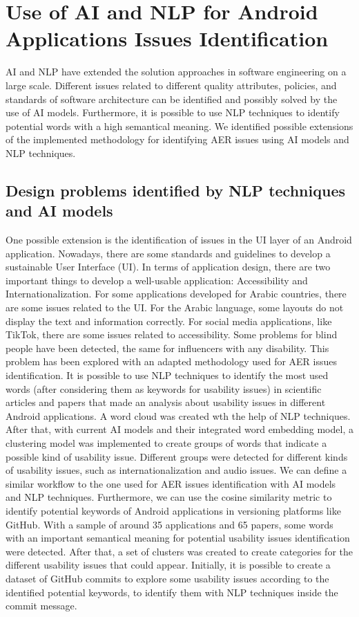 \section{Use of AI and NLP for Android Applications Issues Identification}
AI and NLP have extended the solution approaches in software engineering on a large scale. Different issues related to different quality attributes, policies, and standards of software architecture can be identified and possibly solved by the use of AI models. Furthermore, it is possible to use NLP techniques to identify potential words with a high semantical meaning. We identified possible extensions of the implemented methodology for identifying AER issues using AI models and NLP techniques.

\subsection{Design problems identified by NLP techniques and AI models}
 One possible extension is the identification of issues in the UI layer of an Android application. Nowadays, there are some standards and guidelines to develop a sustainable User Interface (UI). In terms of application design, there are two important things to develop a well-usable application: Accessibility and Internationalization. For some applications developed for Arabic countries, there are some issues related to the UI. For the Arabic language, some layouts do not display the text and information correctly. For social media applications, like TikTok, there are some issues related to accessibility. Some problems for blind people have been detected, the same for influencers with any disability. 
 This problem has been explored with an adapted methodology used for AER issues identification. It is possible to use NLP techniques to identify the most used words (after considering them as keywords for usability issues) in scientific articles and papers that made an analysis about usability issues in different Android applications. A word cloud was created wth the help of NLP techniques. After that, with current AI models and their integrated word embedding model, a clustering model was implemented to create groups of words that indicate a possible kind of usability issue. Different groups were detected for different kinds of usability issues, such as internationalization and audio issues. We can define a similar workflow to the one used for AER issues identification with AI models and NLP techniques. Furthermore, we can use the cosine similarity metric to identify potential keywords of Android applications in versioning platforms like GitHub.
 With a sample of around 35 applications and 65 papers, some words with an important semantical meaning for potential usability issues identification were detected. After that, a set of clusters was created to create categories for the different usability issues that could appear. Initially, it is possible to create a dataset of GitHub commits to explore some usability issues according to the identified potential keywords, to identify them with NLP techniques inside the commit message.